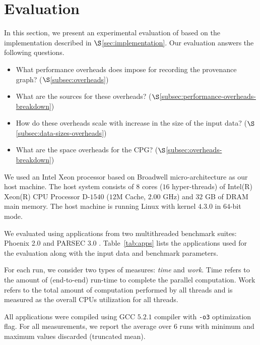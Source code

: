 
\section{Evaluation}
\label{sec:evaluation}
In this section, we present an experimental evaluation of \projecttitle based on the implementation described in  $\S$\ref{sec:implementation}. 
Our evaluation answers the following questions.



\begin{itemize}
\item What performance overheads does \projecttitle impose for recording the provenance graph? ($\S$\ref{subsec:overheads})
\item What are the sources for these overheads? ($\S$\ref{subsec:performance-overheads-breakdown})
\item How do these overheads scale with increase in the size of the input data? ($\S$\ref{subsec:data-sizes-overheads})
\item What are the space overheads for the CPG? ($\S$\ref{subsec:overheads-breakdown})
\end{itemize}




 We used an Intel Xeon processor based on Broadwell micro-architecture
as our host machine. The
host system consists of $8$ cores ($16$ hyper-threads) of Intel(R) Xeon(R) CPU Processor D-$1540$
($12$M Cache, $2.00$ GHz) and $32$ GB of DRAM main memory. The host
machine is running Linux with kernel $4.3.0$ in $64$-bit mode. 


  We evaluated \projecttitle using applications from two multithreaded benchmark suites: Phoenix 2.0 \cite{phoenix} and PARSEC 3.0 \cite{parsec}. Table~\ref{tab:apps} lists the applications used for the evaluation along with the input data and benchmark parameters.


  For each run, we consider two types of measures: \emph{time} and
 {\em work}.  Time refers to the amount of (end-to-end)
run-time to complete the parallel computation.  Work refers to the total amount of
computation performed by all threads and is measured as the overall CPUs utilization for all threads.  


 All applications were compiled using
GCC $5.2.1$ compiler with {\tt -o3} optimization flag. For all
measurements, we report the average over $6$ runs with minimum and maximum values
discarded (truncated mean).


